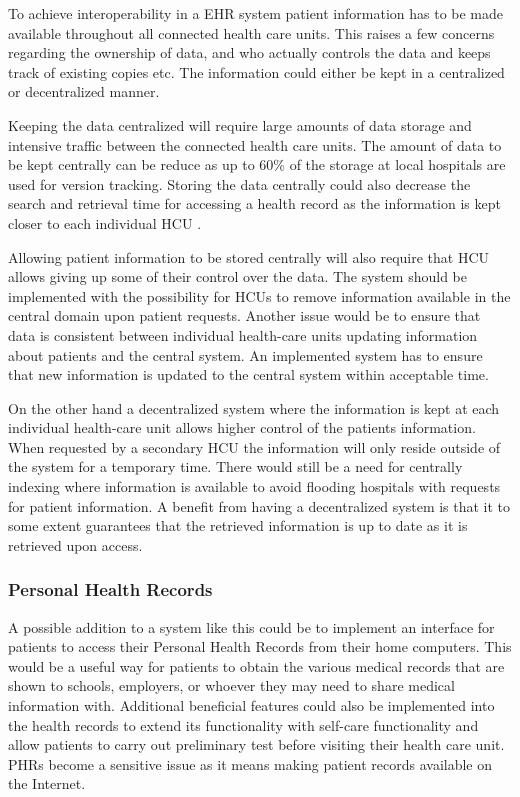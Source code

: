 \documentclass[14pt]{article}
\begin{document}
To achieve interoperability in a \gls{EHR} system patient information has to be made available throughout all connected health care units. This raises a few concerns regarding the ownership of data, and who actually controls the data and keeps track of existing copies etc. The information could either be kept in a centralized or decentralized manner.

Keeping the data centralized will require large amounts of data storage and intensive traffic between the connected health care units. The amount of data to be kept centrally can be reduce as up to 60\% of the storage at local hospitals are used for version tracking. Storing the data centrally could also decrease the search and retrieval time for accessing a health record as the information is kept closer to each individual \gls{HCU} \cite{Cambio}.

Allowing patient information to be stored centrally will also require that \gls{HCU} allows giving up some of their control over the data. The system should be implemented with the possibility for \glspl{HCU} to remove information available in the central domain upon patient requests. Another issue would be to ensure that data is consistent between individual health-care units updating information about patients and the central system. An implemented system has to ensure that new information is updated to the central system within acceptable time.

On the other hand a decentralized system where the information is kept at each individual health-care unit allows higher control of the patients information. When requested by a secondary \gls{HCU} the information will only reside outside of the system for a temporary time. There would still be a need for centrally indexing where information is available to avoid flooding hospitals with requests for patient information. A benefit from having a decentralized system is that it to some extent guarantees that the retrieved information is up to date as it is retrieved upon access.

\subsubsection{Personal Health Records}
\label{sec:resultsPHR}
A possible addition to a system like this could be to implement an interface for patients to access their Personal Health Records from their home computers. This would be a useful way for patients to obtain the various medical records that are shown to schools, employers, or whoever they may need to share medical information with. Additional beneficial features could also be implemented into the health records to extend its functionality with self-care functionality and allow patients to carry out preliminary test before visiting their health care unit. \glspl{PHR} become a sensitive issue as it means making patient records available on the Internet.
\end{document}
